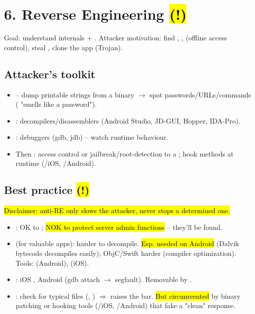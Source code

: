 \section{6. Reverse Engineering \hl{(!)}}
Goal: understand internals + . Attacker motivation: find , ,  (offline access control), steal , clone the app (Trojan).
\subsection{Attacker's toolkit}
\begin{itemize}
\item {} -- dump printable strings from a binary $\to$ spot passwords/URLs/commands ( "smells like a password").
\item {}: decompilers/disassemblers (Android Studio, JD-GUI, Hopper, IDA-Pro).
\item {}: debuggers (gdb, jdb) -- watch runtime behaviour.
\item Then :  access control or jailbreak/root-detection to a ; hook methods at runtime (/iOS, /Android).
\end{itemize}
\subsection{Best practice \hl{(!)}}
\hl{Disclaimer: anti-RE only slows the attacker, never stops a determined one.}
\begin{itemize}
\item {}: OK to ; \hl{NOK to protect server admin functions} -- they'll be found.
\item {} (for valuable apps): harder to decompile. \hl{Esp. needed on Android} (Dalvik bytecode decompiles easily); ObjC/Swift harder (compiler optimization). Tools:  (Android),  (iOS).
\item {}: iOS , Android  (gdb attach $\to$ segfault). Removable by .
\item {}: check for typical files (, ) $\Rightarrow$ raises the bar. \hl{But circumvented} by binary patching or hooking tools (/iOS, /Android) that fake a "clean" response.
\end{itemize}



